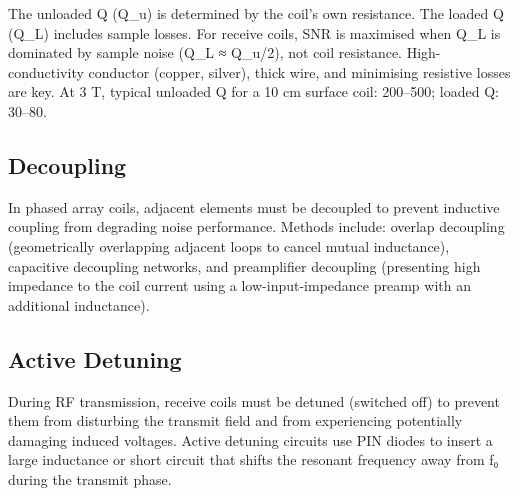 				

The unloaded Q (Q\_u) is determined by the coil's own resistance. The loaded Q (Q\_L) includes sample losses. For receive coils, SNR is maximised when Q\_L is dominated by sample noise (Q\_L ≈ Q\_u/2), not coil resistance. High-conductivity conductor (copper, silver), thick wire, and minimising resistive losses are key. At 3 T, typical unloaded Q for a 10 cm surface coil: 200–500; loaded Q: 30–80.

				

\subsection{Decoupling}

				

In phased array coils, adjacent elements must be decoupled to prevent inductive coupling from degrading noise performance. Methods include: overlap decoupling (geometrically overlapping adjacent loops to cancel mutual inductance), capacitive decoupling networks, and preamplifier decoupling (presenting high impedance to the coil current using a low-input-impedance preamp with an additional inductance).

				

\subsection{Active Detuning}

				

During RF transmission, receive coils must be detuned (switched off) to prevent them from disturbing the transmit field and from experiencing potentially damaging induced voltages. Active detuning circuits use PIN diodes to insert a large inductance or short circuit that shifts the resonant frequency away from f₀ during the transmit phase.



